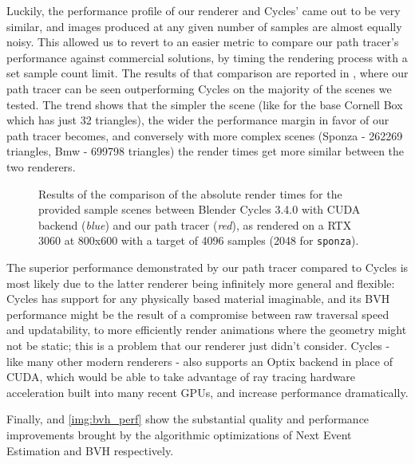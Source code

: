 \documentclass[12pt,a4paper]{article}
\begin{document}
Luckily, the performance profile of our renderer and Cycles' came out to be very similar, and images produced at any given number of samples are almost equally noisy. This allowed us to revert to an easier metric to compare our path tracer's performance against commercial solutions, by timing the rendering process with a set sample count limit. The results of that comparison are reported in , where our path tracer can be seen outperforming Cycles on the majority of the scenes we tested. The trend shows that the simpler the scene (like for the base Cornell Box which has just 32 triangles), the wider the performance margin in favor of our path tracer becomes, and conversely with more complex scenes (Sponza - 262269 triangles, Bmw - 699798 triangles) the render times get more similar between the two renderers.

\begin{figure}[h]
\centering

\caption{Results of the comparison of the absolute render times for the provided sample scenes between Blender Cycles 3.4.0 with CUDA backend (\textit{blue}) and our path tracer (\textit{red}), as rendered on a RTX 3060 at 800x600 with a target of 4096 samples (2048 for \texttt{sponza}).}
\label{img:render_times}
\end{figure}

The superior performance demonstrated by our path tracer compared to Cycles is most likely due to the latter renderer being infinitely more general and flexible: Cycles has support for any physically based material imaginable, and its BVH performance might be the result of a compromise between raw traversal speed and updatability, to more efficiently render animations where the geometry might not be static; this is a problem that our renderer just didn't consider. Cycles - like many other modern renderers - also supports an Optix backend in place of CUDA, which would be able to take advantage of ray tracing hardware acceleration built into many recent GPUs, and increase performance dramatically.

Finally,  and \ref{img:bvh_perf} show the substantial quality and performance improvements brought by the algorithmic optimizations of Next Event Estimation and BVH respectively.
\end{document}
